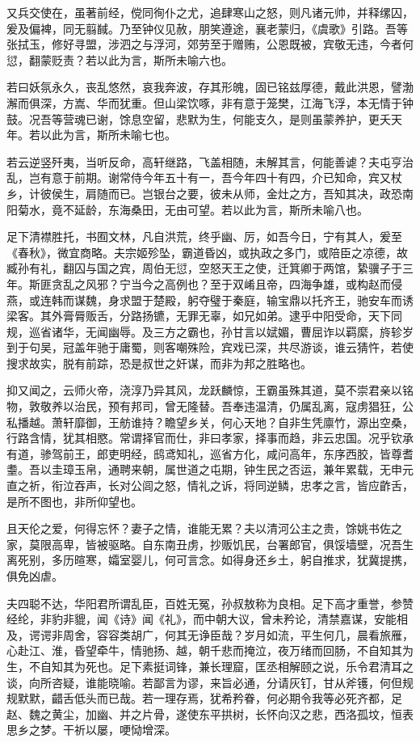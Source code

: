 \documentclass[]{article}
\begin{document}
又兵交使在，虽著前经，傥同徇仆之尤，追肆寒山之怒，则凡诸元帅，并释缧囚，爰及偏裨，同无翦馘。乃至钟仪见赦，朋笑遵途，襄老蒙归，《虞歌》引路。吾等张拭玉，修好寻盟，涉泗之与浮河，郊劳至于赠贿，公恩既被，宾敬无违，今者何愆，翻蒙贬责？若以此为言，斯所未喻六也。

若曰妖氛永久，丧乱悠然，哀我奔波，存其形魄，固已铭兹厚德，戴此洪恩，譬渤澥而俱深，方嵩、华而犹重。但山梁饮啄，非有意于笼樊，江海飞浮，本无情于钟鼓。况吾等营魂已谢，馀息空留，悲默为生，何能支久，是则虽蒙养护，更夭天年。若以此为言，斯所未喻七也。

若云逆竖歼夷，当听反命，高轩继路，飞盖相随，未解其言，何能善谑？夫屯亨治乱，岂有意于前期。谢常侍今年五十有一，吾今年四十有四，介已知命，宾又杖乡，计彼侯生，肩随而已。岂银台之要，彼未从师，金灶之方，吾知其决，政恐南阳菊水，竟不延龄，东海桑田，无由可望。若以此为言，斯所未喻八也。

足下清襟胜托，书囿文林，凡自洪荒，终乎幽、厉，如吾今日，宁有其人，爰至《春秋》，微宜商略。夫宗姬殄坠，霸道昏凶，或执政之多门，或陪臣之凉德，故臧孙有礼，翻囚与国之宾，周伯无愆，空怒天王之使，迁箕卿于两馆，絷骥子于三年。斯匪贪乱之风邪？宁当今之高例也？至于双崤且帝，四海争雄，或构赵而侵燕，或连韩而谋魏，身求盟于楚殿，躬夺璧于秦庭，输宝鼎以托齐王，驰安车而诱梁客。其外膏脣贩舌，分路扬镳，无罪无辜，如兄如弟。逮乎中阳受命，天下同规，巡省诸华，无闻幽辱。及三方之霸也，孙甘言以娬媚，曹屈诈以羁縻，旍轸岁到于句吴，冠盖年驰于庸蜀，则客嘲殊险，宾戏已深，共尽游谈，谁云猜忤，若使搜求故实，脱有前踪，恐是叔世之奸谋，而非为邦之胜略也。

抑又闻之，云师火帝，浇淳乃异其风，龙跃麟惊，王霸虽殊其道，莫不崇君亲以铭物，敦敬养以治民，预有邦司，曾无隆替。吾奉违温清，仍属乱离，寇虏猖狂，公私播越。萧轩靡御，王舫谁持？瞻望乡关，何心天地？自非生凭廪竹，源出空桑，行路含情，犹其相愍。常谓择官而仕，非曰孝家，择事而趋，非云忠国。况乎钦承有道，骖驾前王，郎吏明经，鸱鸢知礼，巡省方化，咸问高年，东序西胶，皆尊耆耋。吾以圭璋玉帛，通聘来朝，属世道之屯期，钟生民之否运，兼年累载，无申元直之祈，衔泣吞声，长对公闾之怒，情礼之诉，将同逆鳞，忠孝之言，皆应齚舌，是所不图也，非所仰望也。

且天伦之爱，何得忘怀？妻子之情，谁能无累？夫以清河公主之贵，馀姚书佐之家，莫限高卑，皆被驱略。自东南丑虏，抄贩饥民，台署郎官，俱馁墙壁，况吾生离死别，多历暄寒，孀室婴儿，何可言念。如得身还乡土，躬自推求，犹冀提携，俱免凶虐。

夫四聪不达，华阳君所谓乱臣，百姓无冤，孙叔敖称为良相。足下高才重誉，参赞经纶，非豹非貔，闻《诗》闻《礼》，而中朝大议，曾未矜论，清禁嘉谋，安能相及，谔谔非周舍，容容类胡广，何其无诤臣哉？岁月如流，平生何几，晨看旅雁，心赴江、淮，昏望牵牛，情驰扬、越，朝千悲而掩泣，夜万绪而回肠，不自知其为生，不自知其为死也。足下素挺词锋，兼长理窟，匡丞相解颐之说，乐令君清耳之谈，向所咨疑，谁能晓喻。若鄙言为谬，来旨必通，分请灰钉，甘从斧镬，何但规规默默，齰舌低头而已哉。若一理存焉，犹希矜眷，何必期令我等必死齐都，足赵、魏之黄尘，加幽、并之片骨，遂使东平拱树，长怀向汉之悲，西洛孤坟，恒表思乡之梦。干祈以屡，哽恸增深。
\end{document}
